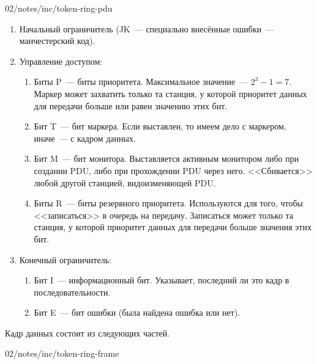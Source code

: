 \image
{\textwidth}
{02/notes/inc/token-ring-pdu}
{}

\begin{enumerate}
    \item Начальный ограничитель (JK~--- специально внесённые ошибки~--- манчестерский код).
    \item Управление доступом:
          \begin{enumerate}
              \item Биты P~--- биты приоритета. Максимальное значение~--- ${2^3-1=7}$. Маркер может захватить только та станция, у которой приоритет данных для передачи больше или равен значению этих бит.
              \item Бит T~--- бит маркера. Если выставлен, то имеем дело с маркером, иначе~--- с кадром данных.
              \item Бит M~--- бит монитора. Выставляется активным монитором либо при создании PDU, либо при прохождении PDU через него. <<Сбивается>> любой другой станцией, видоизменяющей PDU.
              \item Биты R~--- биты резервного приоритета. Используются для того, чтобы <<записаться>> в очередь на передачу. Записаться может только та станция, у которой приоритет данных для передачи больше значения этих бит.
          \end{enumerate}
    \item Конечный ограничитель:
          \begin{enumerate}
              \item Бит I~--- информационный бит. Указывает, последний ли это кадр в последовательности.
              \item Бит E~--- бит ошибки (была найдена ошибка или нет).
          \end{enumerate}
\end{enumerate}

Кадр данных состоит из следующих частей.

\image
{\textwidth}
{02/notes/inc/token-ring-frame}
{}

